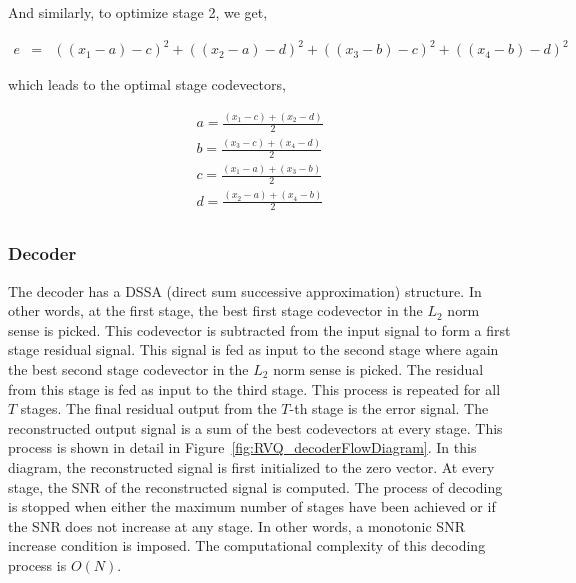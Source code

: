 \begin{Body}
And similarly, to optimize stage 2, we get,

\begin{equation}
\begin{array}{lllll}
e &=& {((x_1 - a) - c)}^2 + {((x_2- a) - d)}^2 + {((x_3 - b) - c)}^2 + {((x_4 - b) - d)}^2
\end{array}
\label{Eqn:2x2RVQ_stage2}
\end{equation}

which leads to the optimal stage codevectors,

\begin{equation}
\begin{array}{lllll}
a = \frac{(x_1 - c) + (x_2 - d)}{2}\\
b = \frac{(x_3 - c) + (x_4 - d)}{2}\\
c = \frac{(x_1 - a) + (x_3 - b)}{2}\\
d = \frac{(x_2 - a) + (x_4 - b)}{2}\\
\end{array}
\end{equation}


\subsubsection{Decoder}
The decoder has a DSSA (direct sum successive approximation) structure.  In other words, at the first stage, the best first stage codevector in the $L_2$ norm sense is picked.  This codevector is subtracted from the input signal to form a first stage residual signal.  This signal is fed as input to the second stage where again the best second stage codevector in the $L_2$ norm sense is picked.  The residual from this stage is fed as input to the third stage.  This process is repeated for all $T$ stages.  The final residual output from the $T$-th stage is the error signal.  The reconstructed output signal is a sum of the best codevectors at every stage.  This process is shown in detail in Figure~\ref{fig:RVQ_decoderFlowDiagram}.  In this diagram, the reconstructed signal is first initialized to the zero vector.  At every stage, the SNR of the reconstructed signal is computed.  The process of decoding is stopped when either the maximum number of stages have been achieved or if the SNR does not increase at any stage.  In other words, a monotonic SNR increase condition is imposed.  The computational complexity of this decoding process is $O(N)$.  



\end{Body}
